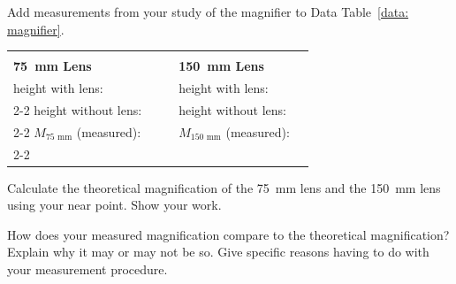 \documentclass[addpoints]{physlabs}
\begin{document}
\begin{postlab}

    \pagebreak


        \filbreak
        \question[1] Add measurements from your study of the magnifier to Data Table~\ref{data: magnifier}.

        \begin{center}
            \renewcommand{\arraystretch}{2}
            \captionsetup{font=normalsize}
            \begin{tabular}{l>{\centering\arraybackslash}p{3cm}cl>{\centering\arraybackslash}p{3cm}}
                \hline
                & & & & \\
                \textbf{75~mm Lens} & & & \textbf{150~mm Lens} & \\
                height with lens: & & & height with lens: & \\
                \cline{2-2}\cline{5-5}
                height without lens: & & & height without lens: & \\
                \cline{2-2}\cline{5-5}
                $M_\text{75 mm}$ (measured): & & & $M_\text{150 mm}$ (measured): & \\
                \cline{2-2}\cline{5-5}
            \end{tabular}
        \end{center}
        \begin{solution}[1cm]   
        \end{solution}

        \filbreak
        \question[1] Calculate the theoretical magnification of the \qty{75}{\milli\meter} lens and the \qty{150}{\milli\meter} lens using your near point. Show your work.
        \begin{solution}[3cm]   
        \end{solution}

        \filbreak
        \question[2] How does your measured magnification compare to the theoretical magnification? Explain why it may or may not be so. Give specific reasons having to do with your measurement procedure.
        \begin{solution}[3cm]   
        \end{solution}


\end{postlab}
\end{document}
